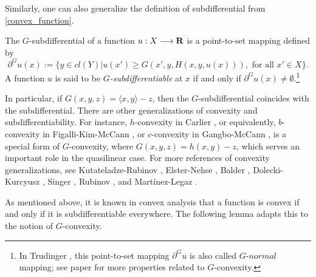 Similarly, one can also generalize the definition of subdifferential from \eqref{convex_function}.\medskip
		
\begin{definition}[$G$-subdifferentiability]\label{defn:GSubdifferential}
	The $G$-subdifferential of a 
	function $u: X \longrightarrow {\mathbf R}$ is a point-to-set mapping defined by
	\begin{equation*}
			\partial^G u(x):= \{ y\in  cl(Y)| u(x')\ge G(x',y, H(x,y,u(x))), \text{ for all } x'\in X\}.
	\end{equation*}
	A function $u$ is said to be {\it $G$-subdifferentiable} at $x$ if and only if $\partial^G u(x) \neq \emptyset$.\footnote{In Trudinger \cite{Trudinger14}, this point-to-set mapping $\partial^G u$ is also called $G$-$normal$ mapping; see paper for more properties related to $G$-convexity.}		
\end{definition}
			
			
			
			
In particular, if $G(x,y,z) = \langle x, y \rangle - z$, then the $G$-subdifferential coincides with the subdifferential. There are other generalizations of convexity and subdifferentiability. For instance, $h$-convexity in Carlier \cite{Carlier01}, or equivalently, $b$-convexity in Figalli-Kim-McCann \cite{FigalliKimMcCann11}, or $c$-convexity in  Gangbo-McCann \cite{GangboMcCann96}, is a special form of $G$-convexity, where $G(x,y,z)=  h(x,y) -z$, which serves an important role in the quasilinear case. For more references of convexity generalizations, see Kutateladze-Rubinov \cite{KutateladzeRubinov72}, Elster-Nehse \cite{ElsterNehse74}, Balder \cite{Balder77}, Dolecki-Kurcyusz \cite{DoleckiKurcyusz78},  Singer \cite{Singer97},  Rubinov \cite{Rubinov00a}, and Martínez-Legaz \cite{MartinezLegaz05}.\medskip
			
			
As mentioned above, it is known in convex analysis that a function is convex if and only if it is subdifferentiable everywhere. The following lemma adapts this to the notion of $G$-convexity. \medskip
			
